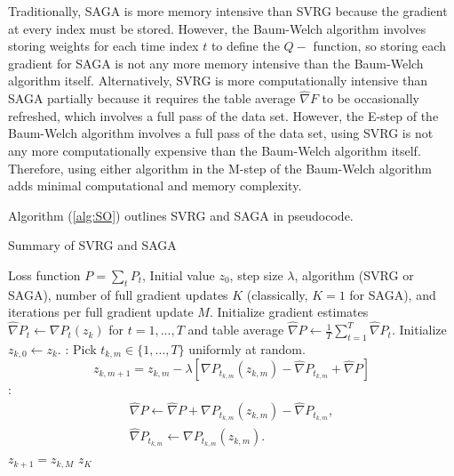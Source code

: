 Traditionally, SAGA is more memory intensive than SVRG because the gradient at every index must be stored. However, the Baum-Welch algorithm involves storing weights for each time index $t$ to define the $Q-$ function, so storing each gradient for SAGA is not any more memory intensive than the Baum-Welch algorithm itself. Alternatively, SVRG is more computationally intensive than SAGA partially because it requires the table average $\widehat \nabla F$ to be occasionally refreshed, which involves a full pass of the data set. However, the E-step of the Baum-Welch algorithm involves a full pass of the data set, using SVRG is not any more computationally expensive than the Baum-Welch algorithm itself. Therefore, using either algorithm in the M-step of the Baum-Welch algorithm adds minimal computational and memory complexity.


Algorithm (\ref{alg:SO}) outlines SVRG and SAGA in pseudocode.

\begin{algorithm}
\caption{Summary of SVRG and SAGA}\label{alg:SO}
\begin{algorithmic}[1]
\Require Loss function $P = \sum_t P_t$, Initial value $z_0$, step size $\lambda$, algorithm (SVRG or SAGA), number of full gradient updates $K$ (classically, $K = 1$ for SAGA), and iterations per full gradient update $M$.
%
\State Initialize gradient estimates $\widehat \nabla P_t \leftarrow \nabla P_t (z_k)$ for $t = 1, ..., T$ and table average $ \widehat \nabla P \gets \frac{1}{T} \sum_{t=1}^T \widehat \nabla P_{t}.$
\State Initialize $z_{k,0} \leftarrow z_k$.
%
:
    \State Pick $t_{k,m} \in \{1,\ldots,T\}$ uniformly at random.
    \State {}
    \begin{equation}
        z_{k,m+1} = z_{k,m} - \lambda \left[\nabla P_{t_{k,m}}(z_{k,m}) - \widehat \nabla P_{t_{k,m}} + \widehat \nabla P \right]
        \label{eqn:SAGA_update0}
    \end{equation}
    :
        \begin{gather}
            \widehat \nabla P \gets \widehat \nabla P + \nabla P_{t_{k,m}}(z_{k,m}) - \widehat \nabla P_{t_{k,m}}, \\
            \widehat \nabla P_{t_{k,m}} \leftarrow \nabla P_{t_{k,m}}(z_{k,m}).
        \end{gather}
    \EndIf
\EndFor
\State $z_{k+1} = z_{k,M}$
\EndFor
\State \Return $z_K$
\end{algorithmic}
\end{algorithm}


